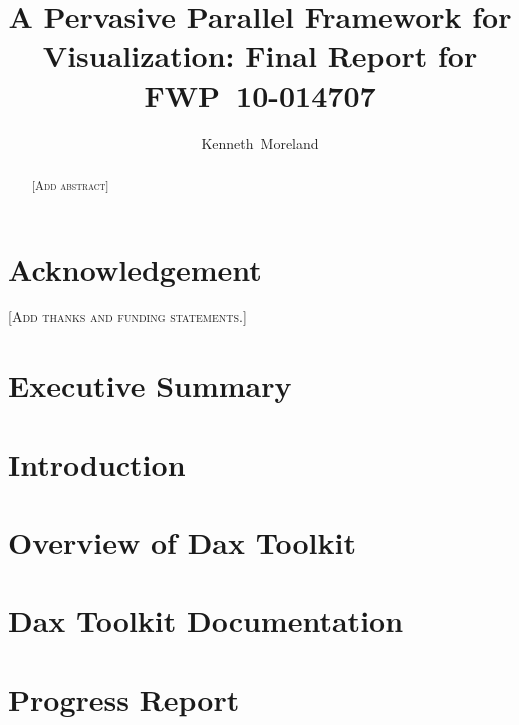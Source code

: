 \documentclass[12pt,report]{SANDreport}
\title{A Pervasive Parallel Framework for Visualization: Final Report for
  FWP~10-014707}
\author{Kenneth~Moreland}
\date{} %
\newcommand{\fix}[1]{{\color{red}\textsc{[#1]}}}
\begin{document}
\sloppy

\maketitle

\begin{abstract}
  \fix{Add abstract}
\end{abstract}

\clearpage

\chapter*{Acknowledgement}

\fix{Add thanks and funding statements.}

\cleardoublepage %
\tableofcontents
\listoffigures
\listoftables
\lstlistoflistings

\clearpage

\chapter*{Executive Summary}



\SANDmain %

\chapter{Introduction}
\label{chap:Introduction}



\chapter{Overview of Dax Toolkit}
\label{chap:Overview}



\chapter{Dax Toolkit Documentation}
\label{chap:Documentation}



\chapter{Progress Report}
\label{chap:ProgressReport}



\clearpage

\providecommand*{\phantomsection}{}
\phantomsection
{}



\begin{flushleft}
  \clearpage
  \lhead[]{}
  \rhead[]{}
  \phantomsection
  \printindex
\end{flushleft}


\end{document}
